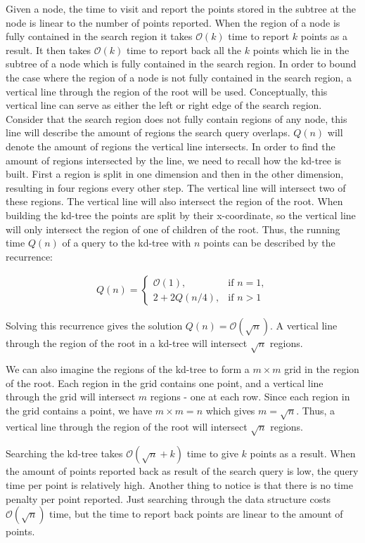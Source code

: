 Given a node, the time to visit and report the points stored in the subtree at the node is linear to the number of points reported. When the region of a node is fully contained in the search region it takes $\mathcal{O}(k)$ time to report $k$ points as a result. It then takes $\mathcal{O}(k)$ time to report back all the $k$ points which lie in the subtree of a node which is fully contained in the search region. In order to bound the case where the region of a node is not fully contained in the search region, a vertical line through the region of the root will be used. Conceptually, this vertical line can serve as either the left or right edge of the search region. Consider that the search region does not fully contain regions of any node, this line will describe the amount of regions the search query overlaps. $Q(n)$ will denote the amount of regions the vertical line intersects. In order to find the amount of regions intersected by the line, we need to recall how the kd-tree is built. First a region is split in one dimension and then in the other dimension, resulting in four regions every other step. The vertical line will intersect two of these regions. The vertical line will also intersect the region of the root. When building the kd-tree the points are split by their x-coordinate, so the vertical line will only intersect the region of one of children of the root. Thus, the running time $Q(n)$ of a query to the kd-tree with $n$ points can be described by the recurrence:

\begin{align*}
  Q(n) = \begin{cases}
    \mathcal{O}(1), & \text{if } n = 1,\\
    2 + 2Q(n/4), & \text{if } n > 1
  \end{cases}
\end{align*}

Solving this recurrence gives the solution $Q(n) = \mathcal{O}(\sqrt{n})$. A vertical line through the region of the root in a kd-tree will intersect $\sqrt{n}$ regions. 

We can also imagine the regions of the kd-tree to form a $m \times m$ grid in the region of the root. Each region in the grid contains one point, and a vertical line through the grid will intersect $m$ regions - one at each row. Since each region in the grid contains a point, we have $m \times m = n$ which gives $m = \sqrt{n}$. Thus, a vertical line through the region of the root will intersect $\sqrt{n}$ regions.

Searching the kd-tree takes $\mathcal{O}(\sqrt{n} + k)$ time to give $k$ points as a result. When the amount of points reported back as result of the search query is low, the query time per point is relatively high. Another thing to notice is that there is no time penalty per point reported. Just searching through the data structure costs $\mathcal{O}(\sqrt{n})$ time, but the time to report back points are linear to the amount of points.


